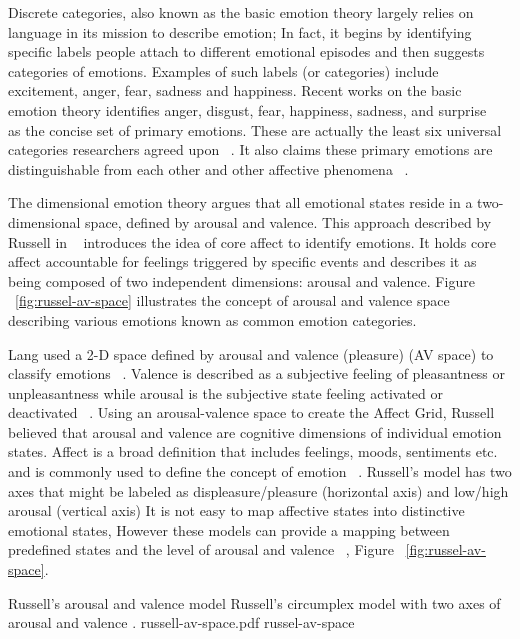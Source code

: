 \documentclass[conference]{IEEEtran}
\begin{document}
Discrete categories, also known as the basic emotion theory largely relies on language in its mission to describe emotion; In fact, it begins by identifying specific labels people attach to different emotional episodes and then suggests categories of emotions. Examples of such labels (or categories) include excitement, anger, fear, sadness and happiness. Recent works on the basic emotion theory identifies anger, disgust, fear, happiness, sadness, and surprise ~\cite{peter2006emotion} as the concise set of primary emotions. These are actually the least six universal categories researchers agreed upon ~\cite{zagalo2004story}. It also claims these primary emotions are distinguishable from each other and other affective phenomena ~\cite{dalgleish1999handbook}.

The dimensional emotion theory argues that all emotional states reside in a two-dimensional space, defined by arousal and valence. This approach described by Russell in ~\cite{russell2003core} introduces the idea of core affect to identify emotions. It holds core affect accountable for feelings triggered by specific events and describes it as being composed of two independent dimensions: arousal and valence. Figure ~\ref{fig:russel-av-space} illustrates the concept of arousal and valence space describing various emotions known as common emotion categories.

Lang used a 2-D space defined by arousal and valence (pleasure) (AV space) to classify emotions ~\cite{lang1995emotion}. Valence is described as a subjective feeling of pleasantness or unpleasantness while arousal is the subjective state feeling activated or deactivated ~\cite{barrett1998discrete}. Using an arousal-valence space to create the Affect Grid, Russell believed that arousal and valence are cognitive dimensions of individual emotion states. Affect is a broad definition that includes feelings, moods, sentiments etc. and is commonly used to define the concept of emotion ~\cite{picard2003affective}. Russell's model has two axes that might be labeled as displeasure/pleasure (horizontal axis) and low/high arousal (vertical axis) It is not easy to map affective states into distinctive emotional states, However these models can provide a mapping between predefined states and the level of arousal and valence ~\cite{zagalo2004story}, Figure ~\ref{fig:russel-av-space}.

\img
{Russell's arousal and valence model}
{Russell's circumplex model with two axes of arousal and valence \footnotemark.}
{russell-av-space.pdf}
{russel-av-space}
\end{document}
